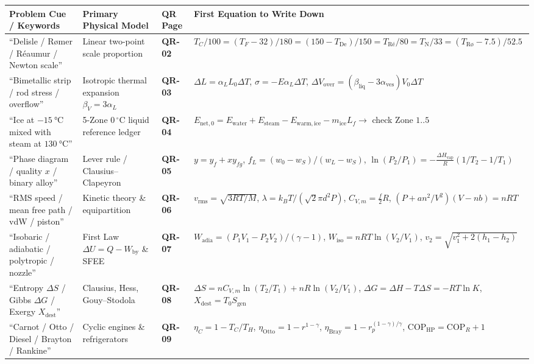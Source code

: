 \documentclass[10pt,twoside,openany,letterpaper]{book}
\begin{document}
\begin{quicksheet}
\begin{formulacard}
\par\smallskip\noindent
\scriptsize\setlength{\tabcolsep}{3pt}\renewcommand{\arraystretch}{1.11}
\begin{tabularx}{\linewidth}{@{}l l l X@{}}
\toprule
\textbf{Problem Cue / Keywords} & \textbf{Primary Physical Model} & \textbf{QR Page} & \textbf{First Equation to Write Down} \\
\midrule
``Delisle / R\o mer / R\'eaumur / Newton scale'' & Linear two-point scale proportion & \textbf{QR-02} & $T_C/100 = (T_F-32)/180 = (150-T_{\mathrm{De}})/150 = T_{\text{R\'e}}/80 = T_{\mathrm{N}}/33 = (T_{\text{R\o}}-7.5)/52.5$ \\
``Bimetallic strip / rod stress / overflow'' & Isotropic thermal expansion $\beta_V=3\alpha_L$ & \textbf{QR-03} & $\Delta L = \alpha_L L_0\Delta T$, $\sigma = -E\alpha_L\Delta T$, $\Delta V_{\mathrm{over}} = (\beta_{\mathrm{liq}}-3\alpha_{\mathrm{ves}})V_0\Delta T$ \\
``Ice at $-\SI{15}{\celsius}$ mixed with steam at $\SI{130}{\celsius}$'' & 5-Zone $0\,^\circ\mathrm{C}$ liquid reference ledger & \textbf{QR-04} & $E_{\mathrm{net},0} = E_{\mathrm{water}} + E_{\mathrm{steam}} - E_{\mathrm{warm,ice}} - m_{\mathrm{ice}}L_f \to$ check Zone $1..5$ \\
``Phase diagram / quality $x$ / binary alloy'' & Lever rule / Clausius--Clapeyron & \textbf{QR-05} & $y = y_f + x y_{fg}$, $f_L = (w_0 - w_S)/(w_L - w_S)$, $\ln(P_2/P_1) = -\frac{\Delta H_{\mathrm{vap}}}{R}(1/T_2 - 1/T_1)$ \\
``RMS speed / mean free path / vdW / piston'' & Kinetic theory \& equipartition & \textbf{QR-06} & $v_{\mathrm{rms}}=\sqrt{3RT/M}$, $\lambda = k_BT/(\sqrt{2}\pi d^2 P)$, $C_{V,m}=\frac{f}{2}R$, $(P+an^2/V^2)(V-nb)=nRT$ \\
``Isobaric / adiabatic / polytropic / nozzle'' & First Law $\Delta U = Q - W_{\mathrm{by}}$ \& SFEE & \textbf{QR-07} & $W_{\mathrm{adia}} = (P_1V_1-P_2V_2)/(\gamma-1)$, $W_{\mathrm{iso}} = nRT\ln(V_2/V_1)$, $v_2 = \sqrt{v_1^2 + 2(h_1-h_2)}$ \\
``Entropy $\Delta S$ / Gibbs $\Delta G$ / Exergy $X_{\mathrm{dest}}$'' & Clausius, Hess, Gouy--Stodola & \textbf{QR-08} & $\Delta S = nC_{V,m}\ln(T_2/T_1)+nR\ln(V_2/V_1)$, $\Delta G = \Delta H - T\Delta S = -RT\ln K$, $X_{\mathrm{dest}} = T_0 S_{\mathrm{gen}}$ \\
``Carnot / Otto / Diesel / Brayton / Rankine'' & Cyclic engines \& refrigerators & \textbf{QR-09} & $\eta_C = 1-T_C/T_H$, $\eta_{\mathrm{Otto}}=1-r^{1-\gamma}$, $\eta_{\mathrm{Bray}}=1-r_p^{(1-\gamma)/\gamma}$, $\mathrm{COP}_{\mathrm{HP}}=\mathrm{COP}_R+1$ \\

\end{tabularx}
\end{formulacard}
\end{quicksheet}
\end{document}

